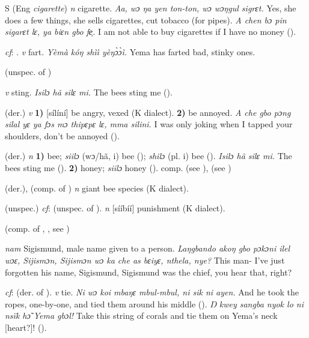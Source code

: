 \begin{letter}{S}
 (Eng \textit{cigarette}) \textit{n} cigarette. \textit{Aa, wɔ ŋa yen ton-ton, wɔ wɔŋgul sigrɛt.} Yes, she does a few things, she sells cigarettes, cut tobacco (for pipes). \textit{A chen bɔ pin sigarɛt lɛ, ya biɛn gbo fe̹.} I am not able to buy cigarettes if I have no money (\citealt{Pichl1967}). 


 \textit{cf}: . \textit{v} fart. \textit{Yèmà kóŋ shìì yèŋɔ̀ɔ̀ì.} Yema has farted bad, stinky ones.

 (unspec. of ) 

 \textit{v} sting. \textit{Isilɔ hã silɛ mi.} The bees sting me (\citealt{Pichl1967}).

 (der.) \textit{v} \textbf{1)} [sílíní] be angry, vexed (K dialect). \textbf{2)} be annoyed. \textit{A che gbo pɔng silal yɛ ya fɔs mɔ thipɛpɛ lɛ, mma silini.} I was only joking when I tapped your shoulders, don't be annoyed (\citealt{Pichl1967}). 

 (der.) \textit{n} \textbf{1)} bee; \textit{siilɔ} (wɔ/hã, i) bee (\citealt{Pichl1967}); \textit{shilɔ} (pl. i) bee (\citealt{Sumner1921}). \textit{Isilɔ hã silɛ mi.} The bees sting me (\citealt{Pichl1967}). \textbf{2)} honey; \textit{siilɔ} honey (\citealt{Pichl1967}). comp.  (see ),  (see )

 (der.), (comp. of ) \textit{n} giant bee species (K dialect). 

 (unspec.) \textit{cf}:  (unspec. of ). \textit{n} [sííbíí] punishment (K dialect). 

 (comp. of , , see ) 

 \textit{nam} Sigismund, male name given to a person. \textit{Laŋgbando akoŋ gbo pɔkɔni ilel wɔɛ, Sijismɔn, Sijismɔn wɔ ka che as bɛiyɛ, nthela, nye?} This man- I've just forgotten his name, Sigismund, Sigismund was the chief, you hear that, right?

 \textit{cf}:  (der. of ). \textit{v} tie. \textit{Ni wɔ koi mbaŋɛ mbul-mbul, ni sik ni ayen.} And he took the ropes, one-by-one, and tied them around his middle (\citealt{Sumner1921}). \textit{Ŋ kwey sangba nyok lo ni nsïk hɔ̃ Yema gbɔl!} Take this string of corals and tie them on Yema's neck [heart?]! (\citealt{Pichl1967}). 


\end{letter}
